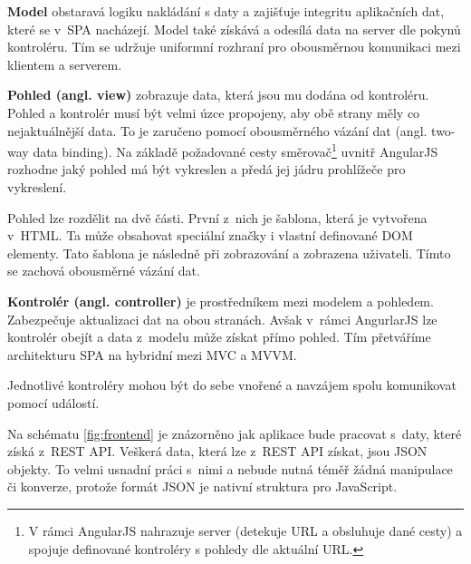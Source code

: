 \begin{description}
    \item {\bf Model} obstaravá logiku nakládání s daty a zajišťuje integritu aplikačních dat, které se v~SPA nacházejí. Model také získává a odesílá data na server dle pokynů kontroléru. Tím se udržuje uniformní rozhraní pro obousměrnou komunikaci mezi klientem a serverem.

    \item {\bf Pohled (angl. view)} zobrazuje data, která jsou mu dodána od kontroléru. Pohled a kontrolér musí být velmi úzce propojeny, aby obě strany měly co nejaktuálnější data. To je zaručeno pomocí obousměrného vázání dat (angl. two-way data binding). Na základě požadované cesty směrovač\footnote{V rámci AngularJS nahrazuje server (detekuje URL a obsluhuje dané cesty) a spojuje definované kontroléry s pohledy dle aktuální URL.} uvnitř AngularJS rozhodne jaký pohled má být vykreslen a předá jej jádru prohlížeče pro vykreslení.

        Pohled lze rozdělit na dvě části. První z~nich je šablona, která je vytvořena v~HTML. Ta může obsahovat speciální značky i vlastní definované DOM elementy. Tato šablona je následně při zobrazování  a zobrazena uživateli. Tímto se zachová obousměrné vázání dat.

    \item {\bf Kontrolér (angl. controller)} je prostředníkem mezi modelem a pohledem. Zabezpečuje aktualizaci dat na obou stranách. Avšak v~rámci AngurlarJS lze kontrolér obejít a data z~modelu může získat přímo pohled. Tím přetváříme architekturu SPA na hybridní mezi MVC a MVVM.

        Jednotlivé kontroléry mohou být do sebe vnořené a navzájem spolu komunikovat pomocí událostí.
\end{description}

Na schématu \ref{fig:frontend} je znázorněno jak aplikace bude pracovat s~daty, které získá z~REST API. Veškerá data, která lze z~REST API získat, jsou JSON objekty. To velmi usnadní práci s~nimi a nebude nutná téměř žádná manipulace či konverze, protože formát JSON je nativní struktura pro JavaScript. 

